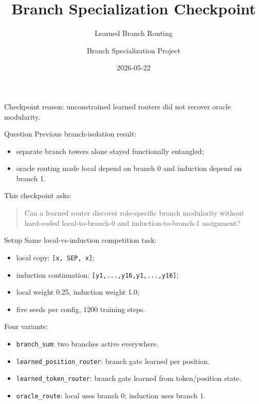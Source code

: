\documentclass[aspectratio=169]{beamer}
\title{Branch Specialization Checkpoint}
\subtitle{Learned Branch Routing}
\author{Branch Specialization Project}
\date{2026-05-22}
\begin{document}
\begin{frame}
  \titlepage
  \vspace{-0.5em}
  \begin{center}
    Checkpoint reason: unconstrained learned routers did not recover oracle modularity.
  \end{center}
\end{frame}

\begin{frame}{Question}
  Previous branch-isolation result:
  \begin{itemize}
    \item separate branch towers alone stayed functionally entangled;
    \item oracle routing made local depend on branch 0 and induction depend on branch 1.
  \end{itemize}

  \vspace{0.8em}
  This checkpoint asks:

  \begin{quote}
    Can a learned router discover role-specific branch modularity without
    hard-coded local-to-branch-0 and induction-to-branch-1 assignment?
  \end{quote}
\end{frame}

\begin{frame}{Setup}
  Same local-vs-induction competition task:
  \begin{itemize}
    \item local copy: \texttt{[x, SEP, x]};
    \item induction continuation: \texttt{[y1,...,y16,y1,...,y16]};
    \item local weight 0.25, induction weight 1.0;
    \item five seeds per config, 1200 training steps.
  \end{itemize}

  \vspace{0.6em}
  Four variants:
  \begin{itemize}
    \item \texttt{branch\_sum}: two branches active everywhere.
    \item \texttt{learned\_position\_router}: branch gate learned per position.
    \item \texttt{learned\_token\_router}: branch gate learned from token/position state.
    \item \texttt{oracle\_route}: local uses branch 0; induction uses branch 1.
  \end{itemize}
\end{frame}
\end{document}

